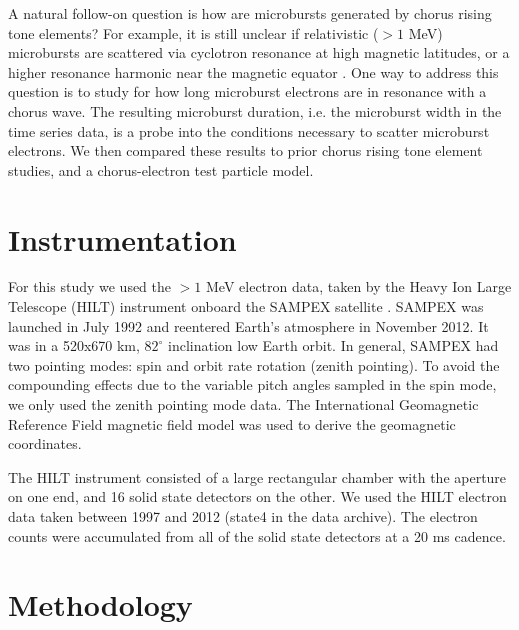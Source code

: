 \documentclass[draft]{agujournal2019}
\begin{document}
A natural follow-on question is how are microbursts generated by chorus rising tone elements? For example, it is still unclear if relativistic ($>1$ MeV) microbursts are scattered via cyclotron resonance at high magnetic latitudes, or a higher resonance harmonic near the magnetic equator \cite{Lorentzen2001a}. One way to address this question is to study for how long microburst electrons are in resonance with a chorus wave. The resulting microburst duration, i.e. the microburst width in the time series data, is a probe into the conditions necessary to scatter microburst electrons.  We then compared these results to prior chorus rising tone element studies, and a chorus-electron test particle model. 

\section{Instrumentation}\label{instrumentation}
For this study we used the $>1$ MeV electron data, taken by the Heavy Ion Large Telescope (HILT) instrument \cite{Klecker1993} onboard the SAMPEX satellite \cite{Baker1993}. SAMPEX was launched in July 1992 and reentered Earth's atmosphere in November 2012. It was in a 520x670 km, $82^\circ$ inclination low Earth orbit. In general, SAMPEX had two pointing modes: spin and orbit rate rotation (zenith pointing). To avoid the compounding effects due to the variable pitch angles sampled in the spin mode, we only used the zenith pointing mode data. The International Geomagnetic Reference Field \cite[IGRF]{Thebault2015} magnetic field model was used to derive the geomagnetic coordinates.

The HILT instrument consisted of a large rectangular chamber with the aperture on one end, and 16 solid state detectors on the other. We used the HILT electron data taken between 1997 and 2012 (state4 in the data archive). The electron counts were accumulated from all of the solid state detectors at a 20 ms cadence.

\section{Methodology}\label{methodology}
\end{document}
